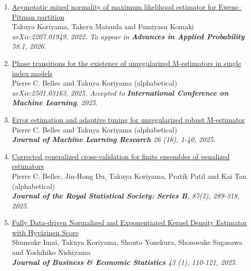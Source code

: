 \documentclass[10pt]{amsart}
\begin{document}
\begin{enumerate}
  \item \href{https://arxiv.org/abs/2207.01949}
  {Asymptotic mixed normality of maximum likelihood estimator for Ewens--Pitman partition}\\
  Takuya Koriyama, Takeru Matsuda and Fumiyasu Komaki\\
  \textit{arXiv:2207.01949, 2022. To appear in \textbf{Advances in Applied Probability} 58.1, 2026.}

  \item \href{https://arxiv.org/abs/2501.03163}{Phase transitions for the existence of unregularized M-estimators in single index models} \\
  Pierre C. Bellec and Takuya Koriyama (alphabetical)\\
  \textit{arXiv:2501.03163, 2025. Accepted to \textbf{International Conference on Machine Learning}, 2025}.

  \item \href{https://jmlr.org/papers/v26/24-0060.html}{Error estimation and adaptive tuning for unregularized robust M-estimator}\\
  Pierre C. Bellec and Takuya Koriyama (alphabetical)\\
  \textit{\textbf{Journal of Machine Learning Research}  26 (16), 1-40, 2025.} 

  \item \href{https://doi.org/10.1093/jrsssb/qkae092}{Corrected generalized cross-validation for finite ensembles of penalized estimators}\\
  Pierre C. Bellec, Jin-Hong Du, Takuya Koriyama, Pratik Patil and Kai Tan (alphabetical)\\
  \textit{\textbf{Journal of the Royal Statistical Society: Series B}, 87(2), 289-318, 2025.} 

  \item  \href{https://www.tandfonline.com/doi/full/10.1080/07350015.2024.2326149?casa_token=_YOXJFqGXa0AAAAA%3AZCueJ9QbEp0N1Yvh8Bm0ieEefDcQECfZyzYWfPd2KTI_yxy9l7rt0cja6c5I4cyVJuAT7q2sfTzo}{Fully Data-driven Normalized and Exponentiated Kernel Density Estimator with Hyvärinen Score}\\
  Shunsuke Imai, Takuya Koriyama, Shouto Yonekura, Shonosuke Sugasawa and Yoshihiko Nishiyama\\
  \textit{\textbf{Journal of Business \& Economic Statistics} 43 (1), 110-121, 2025.
  }
\end{enumerate}

\end{document}
